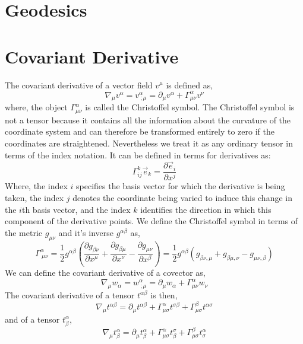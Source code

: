 \section{Geodesics}
\section{Covariant Derivative}
The covariant derivative of a vector field $v^{\mu}$ is defined as,
\begin{equation}
\nabla_{\mu} v^{\alpha} = v^{\alpha}_{ \  ; \mu} = \partial_{\mu} v^{\alpha} + \Gamma^{\alpha}_{\mu \nu} v^{\nu}
\end{equation}
where, the object $\Gamma^{\alpha}_{\mu \nu}$ is called the Christoffel symbol. The Christoffel symbol is not a tensor because it contains all the information about the curvature of the coordinate system and can therefore be transformed entirely to zero if the coordinates are straightened. Nevertheless we treat it as any ordinary tensor in terms of the index notation. It can be defined in terms for derivatives as:
\begin{equation}
\Gamma^{k}_{ij}\vec{e}_{k} = \frac{\partial \vec{e}_{i}}{\partial x^{j}}
\end{equation}
Where, the index $i$ specifies the basis vector for which the derivative is being
taken, the index $j$ denotes the coordinate being varied to induce this change
in the $i$th basis vector, and the index $k$ identifies the direction in which this
component of the derivative points. We define the Christoffel symbol in terms of the metric $g_{\mu \nu}$ and it's inverse $g^{\alpha \beta}$ as,
\begin{equation}
\Gamma^{\alpha}_{\ \mu \nu} = \frac{1}{2} g^{\alpha \beta} \left(\frac{\partial g_{\beta \nu}}{\partial x^{\mu}} + \frac{\partial g_{\beta \mu}}{\partial x^{\nu}} - \frac{\partial g_{\mu \nu}}{\partial x^{\beta}}\right) = \frac{1}{2}g^{\alpha \beta} \left(g_{\beta \nu, \mu} + g_{\beta \mu, \nu} - g_{\mu \nu, \beta}\right)
\end{equation}
We can define the covariant derivative of a covector as,
\begin{equation}
\nabla_{\mu} w_{\alpha} = w^{\alpha}_{ \  ; \mu} = \partial_{\mu} w_{\alpha} + \Gamma^{\alpha}_{\mu \nu} w_{\nu}
\end{equation}
The covariant derivative of a tensor $t^{\alpha\beta}$ is then,
\begin{equation}
\nabla_{\mu}t^{\alpha \beta} = \partial_{\mu} t^{\alpha \beta} + \Gamma^{\alpha}_{\mu \sigma}t^{\sigma \beta} + \Gamma^{\beta}_{\mu \sigma}t^{\alpha \sigma }
\end{equation}
and of a tensor $t^{\alpha}_{\beta}$,
\begin{equation}
\nabla_{\mu}t^{\alpha}_{\beta} = \partial_{\mu} t^{\alpha}_{\beta} + \Gamma^{\alpha}_{\mu \sigma}t^{\sigma}_{\beta} + \Gamma^{\beta}_{\mu \sigma}t^{\alpha}_{\sigma}
\end{equation}
